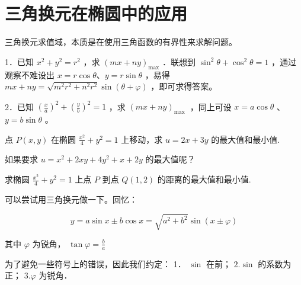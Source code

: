 \section{三角换元在椭圆中的应用}

\begin{definition}
    三角换元求值域，本质是在使用三角函数的有界性来求解问题。

    1．已知 $x^2+y^2=r^2$ ，求 $(m x+n y)_{\text {max}}$ ．联想到 $\sin ^2 \theta+\cos ^2 \theta=1$ ，通过观察不难设出 $x=r \cos \theta 、 y=r \sin \theta$ ，易得 $m x+n y=\sqrt{m^2 r^2+n^2 r^2} \sin (\theta+\varphi)$ ，即可求得答案。

    2．已知 $\left(\frac{x}{a}\right)^2+\left(\frac{y}{b}\right)^2=1$ ，求 $(m x+n y)_{\text {max }}$ ，同上可设 $x=a \cos \theta$ 、 $y=b \sin \theta$ 。
\end{definition}

\begin{example}
    点 $P(x, y)$ 在椭圆 $\frac{x^2}{4}+y^2=1$ 上移动，求 $u = 2x + 3y$ 的最大值和最小值.
\end{example}

\begin{remark}
    如果要求 $u=x^2+2 x y+4 y^2+x+2 y$ 的最大值呢？
\end{remark}

\begin{example}
    求椭圆 $\frac{x^2}{4}+y^2=1$ 上点 $P$ 到点 $Q(1, 2)$ 的距离的最大值和最小值.
\end{example}

\begin{remark}
    可以尝试用三角换元做一下。回忆：

    $$
        y=a \sin x \pm b \cos x=\sqrt{a^2+b^2} \sin (x \pm \varphi)
    $$

    其中 $\varphi$ 为锐角， $\tan \varphi=\frac{b}{a}$

    为了避免一些符号上的错误，因此我们约定：
    1． $\sin$ 在前； $2 . \sin$ 的系数为正； $3 . \varphi$ 为锐角．

\end{remark}